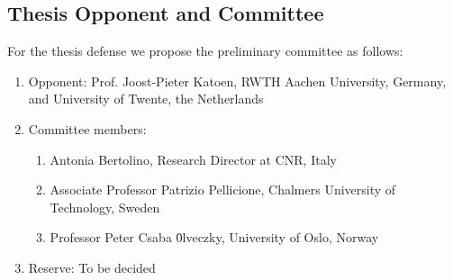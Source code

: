 \subsection{Thesis Opponent and Committee}
For the thesis defense we propose the preliminary committee as follows:
\begin{enumerate}
	\item Opponent: Prof. Joost-Pieter Katoen, RWTH Aachen University, Germany, and University of Twente, the Netherlands
	\item Committee members:
	\begin{enumerate}
		\item Antonia Bertolino, Research Director at CNR, Italy
		\item Associate Professor Patrizio Pellicione, Chalmers University of Technology, Sweden
        \item Professor Peter Csaba {\"0}lveczky, University of Oslo, Norway
	\end{enumerate}
	\item Reserve: To be decided
\end{enumerate}